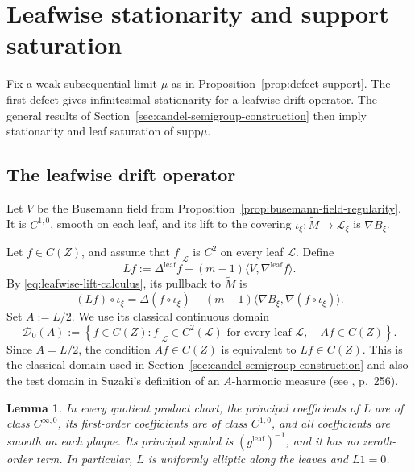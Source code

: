 \documentclass[12pt]{amsart}
\newtheorem{lemma}[theorem]{Lemma}
\theoremstyle{definition}
\numberwithin{equation}{section}
\newcommand{\mc}{\mathcal}
\newcommand{\wti}{\widetilde}
\newcommand{\supp}{\mathrm{supp}}
\begin{document}
\section{Leafwise stationarity and support saturation}
\label{sec:stationarity}

Fix a weak subsequential limit \(\mu\) as in
Proposition~\ref{prop:defect-support}.  The first defect gives
infinitesimal stationarity for a leafwise drift operator.  The general
results of Section~\ref{sec:candel-semigroup-construction} then imply
stationarity and leaf saturation of \(\supp\mu\).

\subsection{The leafwise drift operator}

Let \(V\) be the Busemann field from
Proposition~\ref{prop:busemann-field-regularity}.  It is \(C^{1,0}\),
smooth on each leaf, and its lift to the covering
\(\iota_\xi\colon\wti M\to\mc L_\xi\) is \(\nabla B_\xi\).

Let \(f\in C(Z)\), and assume that \(f|_{\mc L}\) is \(C^2\) on every leaf
\(\mc L\).  Define
\begin{equation}\label{eq:leafwise-L}
  Lf
  :=\Delta^{\mathrm{leaf}}f
    -(m-1)\langle V,\nabla^{\mathrm{leaf}}f\rangle.
\end{equation}
By \eqref{eq:leafwise-lift-calculus}, its pullback to \(\wti M\) is
\begin{equation}\label{eq:leafwise-L-lift}
  (Lf)\circ\iota_\xi
  =\Delta(f\circ\iota_\xi)
   -(m-1)\bigl\langle\nabla B_\xi,
                 \nabla(f\circ\iota_\xi)\bigr\rangle.
\end{equation}
Set \(A:=L/2\).  We use its classical continuous domain
\begin{equation}\label{eq:generator-test-domain}
  \mc D_0(A)
  :=\left\{f\in C(Z):
    f|_{\mc L}\in C^2(\mc L)\text{ for every leaf }\mc L,
    \quad Af\in C(Z)
  \right\}.
\end{equation}
Since \(A=L/2\), the condition \(Af\in C(Z)\) is equivalent to
\(Lf\in C(Z)\).  This is the classical domain used in
Section~\ref{sec:candel-semigroup-construction} and also the test domain
in Suzaki's definition of an \(A\)-harmonic measure (see
\cite{Suzaki2015}, p.~256).

\begin{lemma}
\label{lem:leafwise-L-elliptic}
In every quotient product chart, the principal coefficients of \(L\) are
of class \(C^{\infty,0}\), its first-order coefficients are of
class \(C^{1,0}\), and all coefficients are smooth on each plaque.  Its
principal symbol is \((g^{\mathrm{leaf}})^{-1}\), and it has no
zeroth-order term.  In particular, \(L\) is uniformly elliptic along the
leaves and \(L1=0\).
\end{lemma}
\end{document}
